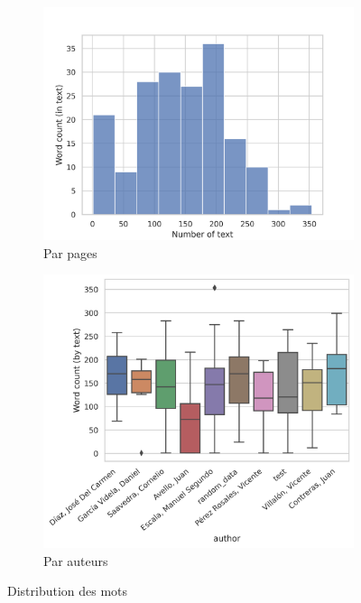 \begin{figure}
     \centering
     \begin{subfigure}[b]{0.8\textwidth}
         \centering
         \includegraphics[width=\textwidth]{annexes/graph/histo_word_total.png}
         \caption{Par pages}
         \label{fig:histo_word_total}
     \end{subfigure}
     \hfill
     \begin{subfigure}[b]{0.8\textwidth}
         \centering
         \includegraphics[width=\textwidth]{annexes/graph/boxtop_word.png}
         \caption{Par auteurs}
         \label{fig:boxtop_word}
     \end{subfigure}
     \caption{Distribution des mots}
    \label{fig:three graphs}
\end{figure}

